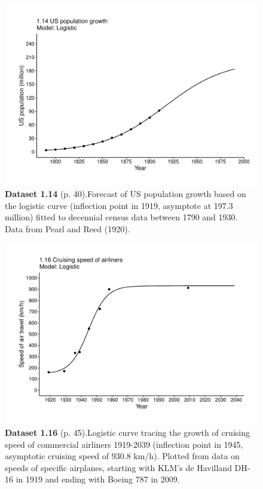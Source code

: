 \documentclass[aps,rmp,preprint,superscriptaddress,10pt,onecolumn]{article}
\begin{document}
\clearpage
\begin{figure}[h]
\includegraphics[width=\textwidth]{output/figs-ggplot/1.14.pdf}
\caption*{\textbf{Dataset 1.14} (p. 40).Forecast of US population growth based on the logistic curve (inflection point in 1919, asymptote at 197.3 million) fitted to decennial census data between 1790 and 1930. Data from Pearl and Reed (1920).}
\end{figure}
	
\clearpage
\begin{figure}[h]
\includegraphics[width=\textwidth]{output/figs-ggplot/1.16.pdf}
\caption*{\textbf{Dataset 1.16} (p. 45).Logistic curve tracing the growth of cruising speed of commercial airliners 1919-2039 (inflection point in 1945, asymptotic cruising speed of 930.8 km/h). Plotted from data on speeds of specific airplanes, starting with KLM's de Havilland DH-16 in 1919 and ending with Boeing 787 in 2009. }
\end{figure}
	
\end{document}
